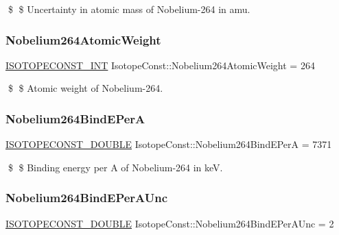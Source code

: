 \$ \$ Uncertainty in atomic mass of Nobelium-\/264 in amu. \mbox{\label{group___isotope_const-_nobelium-_no264_ga277a0c073b85ac4d92eba1f4d3c774bd}} 
\subsubsection{\texorpdfstring{Nobelium264\+Atomic\+Weight}{Nobelium264AtomicWeight}}
{\footnotesize\ttfamily \mbox{\hyperlink{group___isotope_const-_macros_ga5f18360b3e99483a35c32d789e62621c}{I\+S\+O\+T\+O\+P\+E\+C\+O\+N\+S\+T\+\_\+\+I\+NT}} Isotope\+Const\+::\+Nobelium264\+Atomic\+Weight = 264}

\$ \$ Atomic weight of Nobelium-\/264. \mbox{\label{group___isotope_const-_nobelium-_no264_ga585273cfed813ee6d6855989df8e2462}} 
\subsubsection{\texorpdfstring{Nobelium264\+Bind\+E\+PerA}{Nobelium264BindEPerA}}
{\footnotesize\ttfamily \mbox{\hyperlink{group___isotope_const-_macros_ga8f45a7272ce02c0b4c65c44636ed719a}{I\+S\+O\+T\+O\+P\+E\+C\+O\+N\+S\+T\+\_\+\+D\+O\+U\+B\+LE}} Isotope\+Const\+::\+Nobelium264\+Bind\+E\+PerA = 7371}

\$ \$ Binding energy per A of Nobelium-\/264 in keV. \mbox{\label{group___isotope_const-_nobelium-_no264_ga8d55a451b39e125fdcdfd54e80cb3236}} 
\subsubsection{\texorpdfstring{Nobelium264\+Bind\+E\+Per\+A\+Unc}{Nobelium264BindEPerAUnc}}
{\footnotesize\ttfamily \mbox{\hyperlink{group___isotope_const-_macros_ga8f45a7272ce02c0b4c65c44636ed719a}{I\+S\+O\+T\+O\+P\+E\+C\+O\+N\+S\+T\+\_\+\+D\+O\+U\+B\+LE}} Isotope\+Const\+::\+Nobelium264\+Bind\+E\+Per\+A\+Unc = 2}

